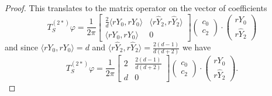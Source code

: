\begin{proof}
    This translates to the matrix operator on the vector of coefficients
    \[
        T_{S}^{(2*)}\varphi = \frac{1}{2\pi}\begin{bmatrix}
            \frac{2}{d}\langle r Y_0, r Y_0\rangle & \langle r \hat{Y}_2, r \hat{Y}_2\rangle\\
            \langle r Y_0, r Y_0\rangle & 0
        \end{bmatrix} \begin{pmatrix}
            c_0\\
            c_2
        \end{pmatrix} \cdot \begin{pmatrix}
            r Y_0\\
            r \hat{Y}_2
        \end{pmatrix}
    \]
    and since $\langle r Y_0, r Y_0\rangle = d$ and $\langle r \hat{Y}_2,  r \hat{Y}_2\rangle = \frac{2(d-1)}{d(d+2)}$ we have
    \[
        T_{S}^{(2*)}\varphi = \frac{1}{2\pi}\begin{bmatrix}
            2 & \frac{2(d-1)}{d(d+2)}\\
            d & 0
        \end{bmatrix} \begin{pmatrix}
            c_0\\
            c_2
        \end{pmatrix} \cdot \begin{pmatrix}
            r Y_0\\
            r \hat{Y}_2
        \end{pmatrix} .
    \]


\end{proof}
